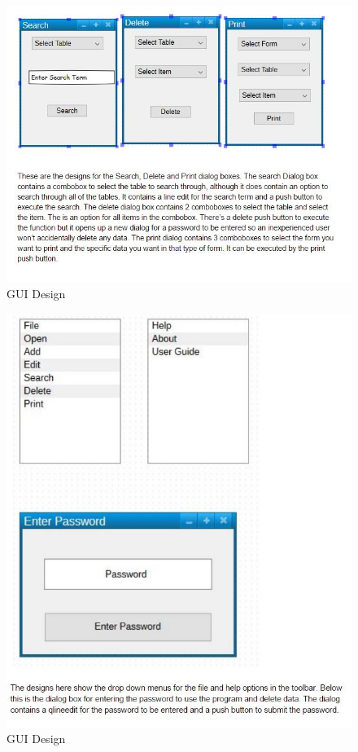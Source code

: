 \begin{figure}[H]
    \includegraphics[width=\textwidth]{Gui_8.JPG}
    \caption{GUI Design} \label{fig:GUI Designs}
\end{figure}

\begin{figure}[H]
    \includegraphics[width=\textwidth]{Gui_9.JPG}
    \caption{GUI Design} \label{fig:GUI Designs}
\end{figure}


